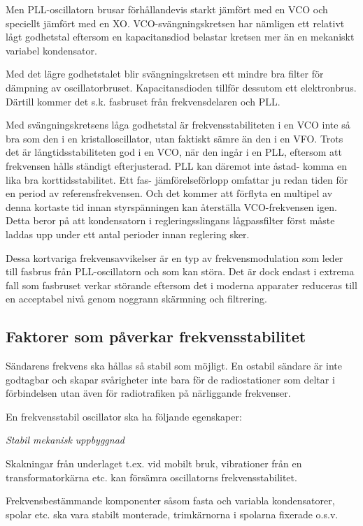Men PLL-oscillatorn brusar förhållandevis starkt jämfört med en VCO
och speciellt jämfört med en XO. VCO-svängningskretsen har nämligen
ett relativt lågt godhetstal eftersom en kapacitansdiod belastar
kretsen mer än en mekaniskt variabel kondensator.

Med det lägre godhetstalet blir svängningskretsen ett mindre bra
filter för dämpning av oscillatorbruset. Kapacitansdioden tillför
dessutom ett elektronbrus. Därtill kommer det s.k. fasbruset från
frekvensdelaren och PLL.

Med svängningskretsens låga godhetstal är frekvensstabiliteten i en
VCO inte så bra som den i en kristalloscillator, utan faktiskt sämre
än den i en VFO. Trots det är långtidsstabiliteten god i en VCO,
när den ingår i en PLL, eftersom att frekvensen hålls ständigt
efterjusterad. PLL kan däremot inte åstad- komma en lika bra
korttidsstabilitet. Ett fas- jämförelseförlopp omfattar ju redan tiden
för en period av referensfrekvensen. Och det kommer att förflyta en
multipel av denna kortaste tid innan styrspänningen kan återställa
VCO-frekvensen igen. Detta beror på att kondensatorn i
regleringsslingans lågpassfilter först måste laddas upp under ett
antal perioder innan reglering sker.

Dessa kortvariga frekvensavvikelser är en typ av frekvensmodulation
som leder till fasbrus från PLL-oscillatorn och som kan störa. Det är
dock endast i extrema fall som fasbruset verkar störande eftersom det
i moderna apparater reduceras till en acceptabel nivå genom noggrann
skärmning och filtrering.

\subsection{Faktorer som påverkar frekvensstabilitet}

Sändarens frekvens ska hållas så stabil som möjligt. En ostabil
sändare är inte godtagbar och skapar svårigheter inte bara för de
radiostationer som deltar i förbindelsen utan även för radiotrafiken
på närliggande frekvenser.

En frekvensstabil oscillator ska ha följande egenskaper:

\emph{Stabil mekanisk uppbyggnad}

Skakningar från underlaget t.ex. vid mobilt bruk, vibrationer från en
transformatorkärna etc. kan försämra oscillatorns frekvensstabilitet.

Frekvensbestämmande komponenter såsom fasta och variabla
kondensatorer, spolar etc. ska vara stabilt monterade, trimkärnorna i
spolarna fixerade o.s.v.

